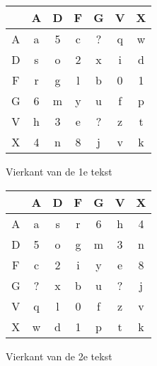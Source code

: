 \begin{figure}[h!]
   \begin{minipage}{0.45\textwidth}
		\begin{tabular}{c || c | c | c | c | c | c |}
		&A&D&F&G&V&X\\	\hline\hline
		A&a&5&c&?&q&w\\ \hline
		D&s&o&2&x&i&d\\ \hline
		F&r&g&l&b&0&1\\ \hline
		G&6&m&y&u&f&p\\ \hline
		V&h&3&e&?&z&t\\ \hline
		X&4&n&8&j&v&k\\ \hline
		\end{tabular}
		\caption{Vierkant van de 1e tekst }
    \end{minipage}
      \hspace{0.5cm}
   \begin{minipage}{0.45\textwidth}
		\begin{tabular}{c || c | c | c | c | c | c |}
		&A&D&F&G&V&X\\	\hline\hline
		A&a&s&r&6&h&4\\ \hline
		D&5&o&g&m&3&n\\ \hline
		F&c&2&i&y&e&8\\ \hline
		G&?&x&b&u&?&j\\ \hline
		V&q&l&0&f&z&v\\ \hline
		X&w&d&1&p&t&k\\ \hline
		\end{tabular}
		\caption{Vierkant van de 2e tekst }
    \end{minipage}
\end{figure}


